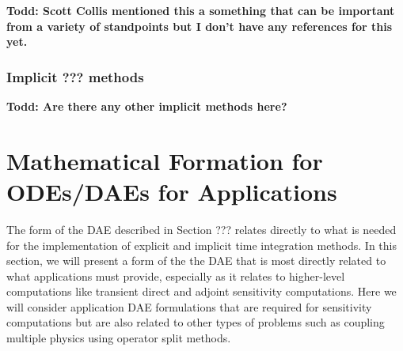 \documentclass[pdf,ps2pdf,11pt]{SANDreport}
\begin{document}
{}\textbf{Todd: Scott Collis mentioned this a something that can be important
from a variety of standpoints but I don't have any references for this yet.}

\subsubsection{Implicit ??? methods}

{}\textbf{Todd: Are there any other implicit methods here?}


\section{Mathematical Formation for ODEs/DAEs for Applications}

The form of the DAE described in Section ??? relates directly to what is
needed for the implementation of explicit and implicit time integration
methods.  In this section, we will present a form of the the DAE that is most
directly related to what applications must provide, especially as it relates
to higher-level computations like transient direct and adjoint sensitivity
computations.  Here we will consider application DAE formulations that are
required for sensitivity computations but are also related to other types of
problems such as coupling multiple physics using operator split methods.
\end{document}
